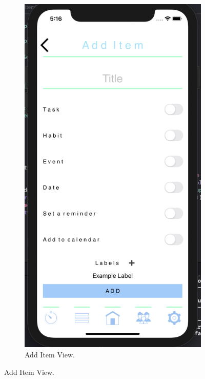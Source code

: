 \begin{figure}[H]
    \centering
    \begin{subfigure}[b]{0.3\textwidth}
        \centering
        \includegraphics[width=\textwidth]{./graphics/Implementation/Add Item/add item.png}
        \caption{Add Item View.}
        \label{fig:add_item_app}

\end{subfigure}
\end{figure}
